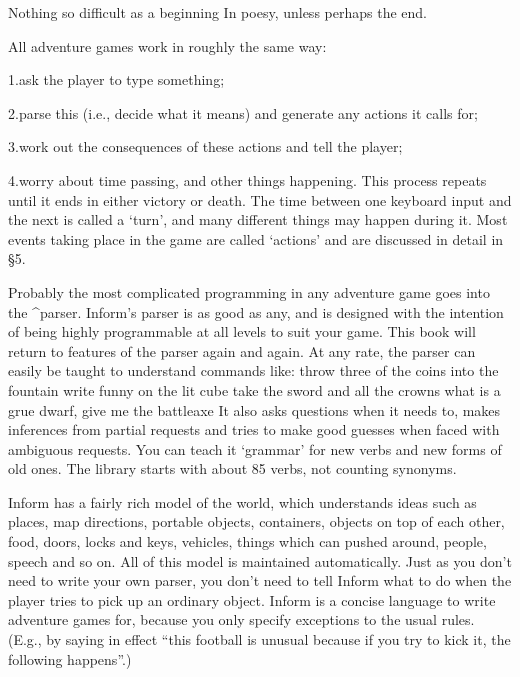 \poem
Nothing so difficult as a beginning
In poesy, unless perhaps the end.

\noindent
All adventure games work in roughly the same way:
\medskip
\item{1.}{ask the player to type something;}
\item{2.}{parse this (i.e., decide what it means) and generate any actions it
calls for;}
\item{3.}{work out the consequences of these actions and tell the player;}
\item{4.}{worry about time passing, and other things happening.}
\medskip\noindent
This process repeats until it ends in either victory or death.  The time
between one keyboard input and the next is called a `turn', and many different
things may happen during it.  Most events taking place in the game are called
`actions' and are discussed in detail in \S 5.

Probably the most complicated programming in any adventure game goes into the
^{parser}.  Inform's parser is as good as any, and is designed with the intention
of being highly programmable at all levels to suit your game.  This book
will return to features of the parser again and again.  At any rate, the parser
can easily be taught to understand commands like:
\beginstt
throw three of the coins into the fountain
write funny on the lit cube
take the sword and all the crowns
what is a grue
dwarf, give me the battleaxe
\endtt
It also asks questions when it needs to, makes inferences from partial requests
and tries to make good guesses when faced with ambiguous requests.  You can
teach it `grammar' for new verbs and new forms of old ones.  The library
starts with about 85 verbs, not counting synonyms.

Inform has a fairly rich model of the world, which understands ideas such
as places, map directions, portable objects, containers, objects on top of
each other, food, doors, locks and keys, vehicles, things which can pushed
around, people, speech and so on.  All of this model is maintained
automatically.  Just as you don't need to write your own parser, you
don't need to tell Inform what to do when the player tries to pick up
an ordinary object.  Inform is a concise language to write adventure games
for, because you only specify exceptions to the usual rules.  (E.g., by
saying in effect ``this football is unusual because if you try to kick
it, the following happens''.)

